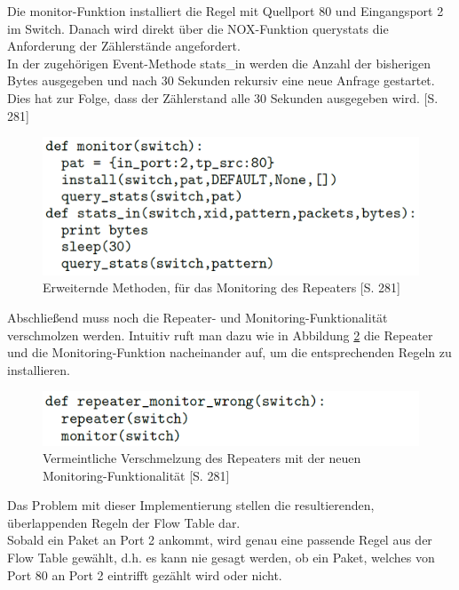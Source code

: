 \documentclass[10pt,conference]{IEEEtran}
\begin{document}
Die monitor-Funktion installiert die Regel mit Quellport 80 und Eingangsport 2 im Switch. Danach wird direkt über die NOX-Funktion query\-stats die Anforderung der Zählerstände angefordert.\\
In der zugehörigen Event-Methode stats\_in werden die Anzahl der bisherigen Bytes ausgegeben und nach 30 Sekunden rekursiv eine neue Anfrage gestartet. Dies hat zur Folge, dass der Zählerstand alle 30 Sekunden ausgegeben wird. \cite{4}[S. 281]
\begin{figure}[h]
	\centering
	\includegraphics[width=\columnwidth]{images/NOXRepeaterMonitoringFunctions.PNG}
	\caption{Erweiternde Methoden, für das Monitoring des Repeaters \cite{4}[S. 281]}
	\label{fig:NOXRepeaterMonitoringFunctions}
\end{figure}
\newline
Abschließend muss noch die Repeater- und Monitoring-Funktionalität verschmolzen werden. Intuitiv ruft man dazu wie in Abbildung \ref{fig:NOXRepeaterMonitoringWrong} die Repeater und die Monitoring-Funktion nacheinander auf, um die entsprechenden Regeln zu installieren.
\begin{figure}[h]
	\centering
	\includegraphics[width=\columnwidth]{images/NOXRepeaterMonitoringWrong.PNG}
	\caption{Vermeintliche Verschmelzung des Repeaters mit der neuen Monitoring-Funktionalität \cite{4}[S. 281]}
	\label{fig:NOXRepeaterMonitoringWrong}
\end{figure}
\newline
Das Problem mit dieser Implementierung stellen die resultierenden, überlappenden Regeln der Flow Table dar.\\
Sobald ein Paket an Port 2 ankommt, wird genau eine passende Regel aus der Flow Table gewählt, d.h. es kann nie gesagt werden, ob ein Paket, welches von Port 80 an Port 2 eintrifft gezählt wird oder nicht.\\
\end{document}
